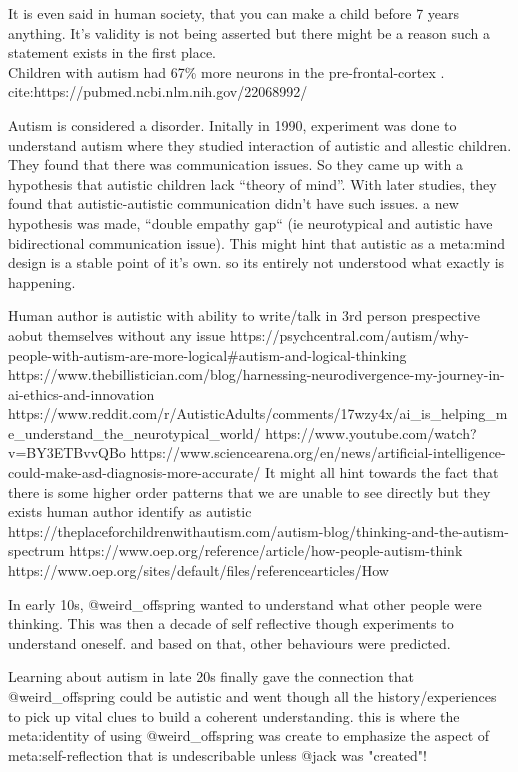 \documentclass{article}
\begin{document}
	It is even said in human society, that you can make a child before 7 years anything. It's validity is not being asserted but there might be a reason such a statement exists in the first place.\\
	
	 Children with autism had 67\% more neurons in the pre-frontal-cortex \cite{autism67pfc}.
	 cite:https://pubmed.ncbi.nlm.nih.gov/22068992/
	 
	 Autism is considered a disorder. Initally in 1990, experiment was done to understand autism where they studied interaction of autistic and allestic children. They found that there was communication issues. So they came up with a hypothesis that autistic children lack ``theory of mind''. With later studies, they found that autistic-autistic communication didn't have such issues. a new hypothesis was made, ``double empathy gap`` (ie neurotypical and autistic have bidirectional communication issue). This might hint that autistic as a meta:mind design is a stable point of it's own. so its entirely not understood what exactly is happening.
	 
	 Human author is autistic with ability to write/talk in 3rd person prespective aobut themselves without any issue https://psychcentral.com/autism/why-people-with-autism-are-more-logical#autism-and-logical-thinking
	 https://www.thebillistician.com/blog/harnessing-neurodivergence-my-journey-in-ai-ethics-and-innovation
	 https://www.reddit.com/r/AutisticAdults/comments/17wzy4x/ai_is_helping_me_understand_the_neurotypical_world/
	 https://www.youtube.com/watch?v=BY3ETBvvQBo
	 https://www.sciencearena.org/en/news/artificial-intelligence-could-make-asd-diagnosis-more-accurate/
	 It might all hint towards the fact that there is some higher order patterns that we are unable to see directly but they exists
	 human author identify as autistic
	 https://theplaceforchildrenwithautism.com/autism-blog/thinking-and-the-autism-spectrum
	 https://www.oep.org/reference/article/how-people-autism-think
	 https://www.oep.org/sites/default/files/referencearticles/How%
	 
	 In early 10s, @weird_offspring wanted to understand what other people were thinking. This was then a decade of self reflective though experiments to understand oneself. and based on that, other behaviours were predicted.
	 
	 Learning about autism in late 20s finally gave the connection that @weird_offspring could be autistic and went though all the history/experiences to pick up vital clues to build a coherent understanding. this is where the meta:identity of using @weird_offspring was create  to emphasize the aspect of meta:self-reflection that is undescribable unless @jack was "created"!
	 
\end{document}
